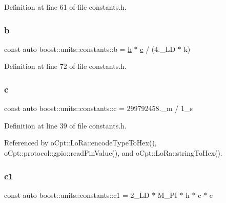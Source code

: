 Definition at line 61 of file constants.\+h.

\hypertarget{namespaceboost_1_1units_1_1constants_a573524689deff9e05d853350304e9635}{}\label{namespaceboost_1_1units_1_1constants_a573524689deff9e05d853350304e9635} 
\subsubsection{\texorpdfstring{b}{b}}
{\footnotesize\ttfamily const auto boost\+::units\+::constants\+::b = \hyperlink{namespaceboost_1_1units_1_1constants_a744f5a50efb6701fcbde9527affd7776}{h} $\ast$ \hyperlink{namespaceboost_1_1units_1_1constants_a1e4c07de84b2d43e7717eaada50b32de}{c} / (4.\+\_\+\+L\+D $\ast$ k)}



Definition at line 72 of file constants.\+h.

\hypertarget{namespaceboost_1_1units_1_1constants_a1e4c07de84b2d43e7717eaada50b32de}{}\label{namespaceboost_1_1units_1_1constants_a1e4c07de84b2d43e7717eaada50b32de} 
\subsubsection{\texorpdfstring{c}{c}}
{\footnotesize\ttfamily const auto boost\+::units\+::constants\+::c = 299792458.\+\_\+m / 1\+\_\+s}



Definition at line 39 of file constants.\+h.



Referenced by o\+Cpt\+::\+Lo\+Ra\+::encode\+Type\+To\+Hex(), o\+Cpt\+::protocol\+::gpio\+::read\+Pin\+Value(), and o\+Cpt\+::\+Lo\+Ra\+::string\+To\+Hex().

\hypertarget{namespaceboost_1_1units_1_1constants_a77173e14008b7c3de3353a905112a18c}{}\label{namespaceboost_1_1units_1_1constants_a77173e14008b7c3de3353a905112a18c} 
\subsubsection{\texorpdfstring{c1}{c1}}
{\footnotesize\ttfamily const auto boost\+::units\+::constants\+::c1 = 2\+\_\+\+L\+D $\ast$ M\+\_\+\+P\+I $\ast$ h $\ast$ c $\ast$ c}



